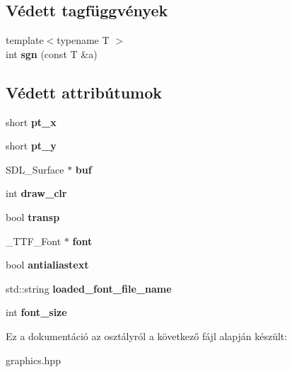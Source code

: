 \subsection*{Védett tagfüggvények}
\begin{DoxyCompactItemize}
\item 
\mbox{\label{classgenv_1_1canvas_a7d2385f86f8e25db8c3a9254037e42df}} 
{\footnotesize template$<$typename T $>$ }\\int {\bfseries sgn} (const T \&a)
\end{DoxyCompactItemize}
\subsection*{Védett attribútumok}
\begin{DoxyCompactItemize}
\item 
\mbox{\label{classgenv_1_1canvas_a4b7ebfdeae85fea93d7d42627e7a4919}} 
short {\bfseries pt\+\_\+x}
\item 
\mbox{\label{classgenv_1_1canvas_ab6429e418598bad6fe741dbe91f5be6b}} 
short {\bfseries pt\+\_\+y}
\item 
\mbox{\label{classgenv_1_1canvas_a6ca0cd219fcf31c40782584639d2529a}} 
S\+D\+L\+\_\+\+Surface $\ast$ {\bfseries buf}
\item 
\mbox{\label{classgenv_1_1canvas_a016e8269b583c1cee52b462ddcf12da9}} 
int {\bfseries draw\+\_\+clr}
\item 
\mbox{\label{classgenv_1_1canvas_a3c35d75d98e09c7a631cdba7ad80ed7e}} 
bool {\bfseries transp}
\item 
\mbox{\label{classgenv_1_1canvas_a2c732f76f91edcc63269a964a87d4e99}} 
\+\_\+\+T\+T\+F\+\_\+\+Font $\ast$ {\bfseries font}
\item 
\mbox{\label{classgenv_1_1canvas_a4def7539f99a07252d83a2ebe11c5116}} 
bool {\bfseries antialiastext}
\item 
\mbox{\label{classgenv_1_1canvas_a9d432f9f584dfe620becf4fe30ea5fb9}} 
std\+::string {\bfseries loaded\+\_\+font\+\_\+file\+\_\+name}
\item 
\mbox{\label{classgenv_1_1canvas_a53d8e4a8b3d3d88330783b999be8e6ef}} 
int {\bfseries font\+\_\+size}
\end{DoxyCompactItemize}


Ez a dokumentáció az osztályról a következő fájl alapján készült\+:\begin{DoxyCompactItemize}
\item 
graphics.\+hpp\end{DoxyCompactItemize}
